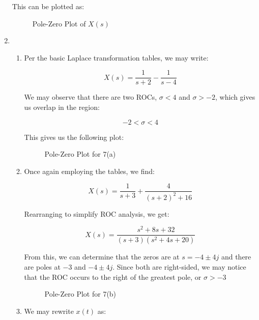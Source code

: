 \begin{enumerate}
          This can be plotted as:

          \begin{figure}[H]
            \centering
            
            \caption{Pole-Zero Plot of $X(s)$}
            \label{fig:1}
          \end{figure}

  \item

    \begin{enumerate}

      \item 

        Per the basic Laplace transformation tables, we may write:

        $$\boxed{X(s)=\frac{1}{s+2}-\frac{1}{s-4}}$$

        We may observe that there are two ROCs, $\sigma<4$ and $\sigma>-2$, which gives us overlap in the region:

        $$\boxed{-2<\sigma<4}$$

        This gives us the following plot:

        \begin{figure}[H]
          \centering
          
          \caption{Pole-Zero Plot for 7(a)}
          \label{fig:2}
        \end{figure}

      \item 

        Once again employing the tables, we find:

        $$X(s)=\frac{1}{s+3}+\frac{4}{(s+2)^2+16}$$

        Rearranging to simplify ROC analysis, we get:

        $$\boxed{X(s)=\frac{s^2+8s+32}{(s+3)(s^2+4s+20)}}$$

        From this, we can determine that the zeros are at $s=-4\pm4j$ and there are poles at $-3$ and $-4\pm4j$. Since both are right-sided, we may notice that the ROC occurs to the right of the greatest pole, or $\sigma>-3$

        \begin{figure}[H]
          \centering
          
          \caption{Pole-Zero Plot for 7(b)}
          \label{fig:3}
        \end{figure}

      \item 

        We may rewrite $x(t)$ as:


\end{enumerate}
\end{enumerate}
